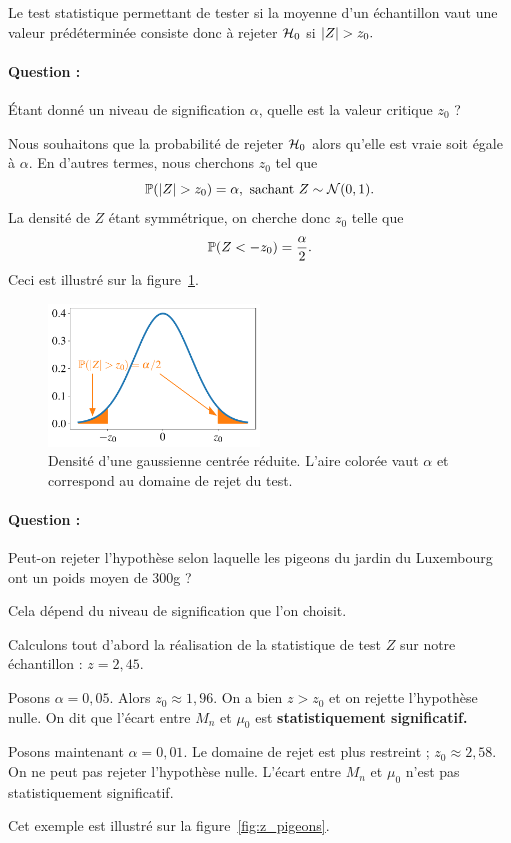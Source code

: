 Le test statistique permettant de tester si la moyenne d'un échantillon vaut
une valeur prédéterminée consiste donc à rejeter $\mathcal{H}_0$ si $\lvert Z\rvert > z_0.$

\paragraph{Question : } Étant donné un niveau de signification $\alpha$, quelle
est la valeur critique $z_0$ ?
\bigskip

\begin{answer}
	Nous souhaitons que la probabilité de rejeter $\mathcal{H}_0$ alors qu'elle est vraie
	soit égale à $\alpha.$ En d'autres termes, nous cherchons $z_0$ tel que
	\[
	\mathbb{P}(\lvert Z\rvert > z_0) = \alpha, \text{ sachant } Z \sim \mathcal{N}(0, 1).
	\]
	La densité de $Z$ étant symmétrique, on cherche donc $z_0$ telle que 
	\[
	\mathbb{P}(Z < -z_0) = \frac{\alpha}{2}.
	\]
	Ceci est illustré sur la figure~\ref{fig:z_moyenne}.  
\end{answer}

\begin{figure}[h]
	\centering
	\includegraphics[width=0.5\textwidth]{figures/tests/z_moyenne}
	\caption{Densité d'une gaussienne centrée réduite. L'aire colorée vaut
		$\alpha$ et correspond au domaine de rejet du test.}
	\label{fig:z_moyenne}
\end{figure}

\paragraph{Question :} Peut-on rejeter l'hypothèse selon laquelle les pigeons
du jardin du Luxembourg ont un poids moyen de 300g ?
\bigskip

\begin{answer}
	Cela dépend du niveau de signification que l'on choisit.
	
	Calculons tout d'abord la réalisation de la statistique de test $Z$ sur notre
	échantillon : $z = 2,45.$
	
	Posons $\alpha = 0,05.$ Alors $z_0 \approx 1,96.$ On a bien $z > z_0$ et on
	rejette l'hypothèse nulle. On dit que l'écart entre $M_n$ et $\mu_0$ est
	\textbf{statistiquement significatif.}
	
	Posons maintenant $\alpha = 0,01.$ Le domaine de rejet est plus restreint ;
	$z_0 \approx 2,58.$ On ne peut pas rejeter l'hypothèse nulle. L'écart entre
	$M_n$ et $\mu_0$ n'est pas statistiquement significatif.
	
	
	Cet exemple est illustré sur la figure~\ref{fig:z_pigeons}.
\end{answer}


